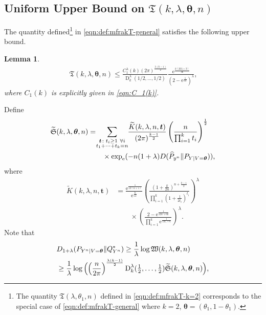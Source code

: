 \documentclass[journal, 10pt]{IEEEtran}
\newcommand{\rme}{\mathrm{e}}
\newcommand{\mfrakS}{\mathfrak{S}}
\newcommand{\mfrakT}{\mathfrak{T}}
\newcommand{\mfrakW}{\mathfrak{W}}
\theoremstyle{plain}
\theoremstyle{plain}
\newtheorem{lem}{Lemma}%
\theoremstyle{plain}
\theoremstyle{plain}
\newcommand{\boldtheta}{\mathbold{\theta}}
\newcommand{\boldt}{\mathbold{t}}
\newcommand{\opD}{\operatorname{D}}
\begin{document}
\begin{appendices}
\section{Uniform Upper Bound on $\mfrakT(k, \lambda, \boldtheta, n) $ } \label{appdx:uniform upper bound on the sum}
The quantity defined\footnote{The quantity $\mfrakT(\lambda, \theta_1, n) $ defined in \eqref{eqn:def:mfrakT-k=2} corresponds to the special case of \eqref{eqn:def:mfrakT-general} where $k=2 $, $\boldtheta=(\theta_1, 1-\theta_1 ) $.} in \eqref{eqn:def:mfrakT-general} satisfies the following upper bound.
\begin{lem} \label{lem:uniform bound on the sum}
\begin{align}
\mfrakT(k, \lambda, \boldtheta, n) \le \frac{C_1^\lambda(k) (2\pi)^{\frac{\lambda(k-1)}{2}} }{\opD_k^\lambda(1/2, \hdots, 1/2)}\frac{\rme^\frac{k(20\lambda+3)}{36}}{(2-\rme^\frac{1}{6k})^\lambda}\text{,} \label{eqn:lem:mfrakT}
\end{align}
where $C_1(k)$ is explicitly given in \eqref{eqn:C_1(k)}.
\end{lem}
\begin{IEEEproof}
Define
\begin{align}
\widetilde{\mfrakS}(k, \lambda, \boldtheta, n ) &= \hspace{-0.8mm} \sum_{\substack{\boldt \colon t_i\ge 1 \ \forall i \\ t_1+\cdots+t_k=n} } \hspace{-0.8mm} \frac{\widetilde{K}(k, \lambda, n, \boldt )}{(2\pi)^\frac{k-1}{2}} \left(\frac{n}{\prod_{i=1}^{k}t_i}\right)^\frac12  \\
&\qquad \times \exp_\rme(-n(1+\lambda)D(\widehat{P}_{y^n}\|P_{Y|V=\boldtheta}))\text{,} \nonumber 
\end{align}
where
\begin{align}
\widetilde{K}(k, \lambda, n, \boldt ) &=
\frac{\rme^\frac{1}{12(n+1)}}{\rme^\frac{k}{12}}\left( \frac{\left( 1+\frac{k}{2n} \right)^{n+\frac{k-1}{2}}}{ \prod_{i=1}^{k}\left( 1+\frac{1}{2t_i} \right)^{t_i}} \right)^\lambda  \\ 
&\qquad \times
\left(\frac{2-\rme^{\frac{1}{12n+6k}}}{\prod_{i=1}^{k} \rme^\frac{1}{12t_i+6}}\right)^\lambda\text{.} \nonumber
\end{align}
Note that
\begin{align}
&D_{1+\lambda}(P_{Y^n|V=\boldtheta}\|Q^\ast_{Y^n}) \ge
\frac{1}{\lambda}\log \mfrakW(k, \lambda, \boldtheta, n) \label{after_psi-shorter} \\
&\ge 
\frac{1}{\lambda}\log  \Big(\hspace{-0.1mm}\Big(\frac{n}{2\pi} \Big)^\frac{\lambda(k-1)}{2} \opD^\lambda_k(\tfrac12, \hdots, \tfrac12)\widetilde{\mfrakS}(k, \lambda, \boldtheta, n )\hspace{-0.1mm} \Big)  \text{,} \label{bxzy}

\end{align}
\end{IEEEproof}
\end{appendices}
\end{document}
